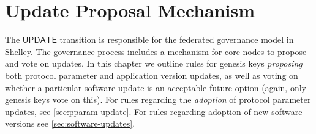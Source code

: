 \section{Update Proposal Mechanism}
\label{sec:update}


The $\mathsf{UPDATE}$ transition is responsible for the federated governance model in Shelley.
The governance process includes a mechanism for core nodes to propose and vote on
updates. In this chapter we
outline rules for genesis keys \textit{proposing} both protocol parameter
and application version updates, as well as voting on whether a particular
software update is an acceptable future option (again, only genesis keys vote on this).
For rules regarding the \textit{adoption} of protocol
parameter updates, see \ref{sec:pparam-update}. For rules regarding
adoption of new software versions see \ref{sec:software-updates}.

